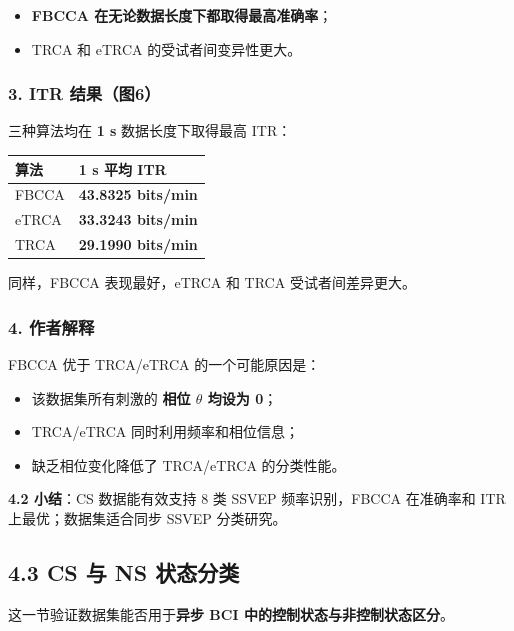 \documentclass[12pt, a4paper]{ctexart}
\begin{document}
\begin{itemize}
  \item \textbf{FBCCA 在无论数据长度下都取得最高准确率}；
  \item TRCA 和 eTRCA 的受试者间变异性更大。
\end{itemize}

\subsubsection*{3. ITR 结果（图6）}

三种算法均在 \textbf{1 s} 数据长度下取得最高 ITR：

\begin{table}[h]
\centering\small
\begin{tabular}{ll}
\toprule
\textbf{算法} & \textbf{1 s 平均 ITR} \\
\midrule
FBCCA & \textbf{43.8325 bits/min} \\
eTRCA & \textbf{33.3243 bits/min} \\
TRCA & \textbf{29.1990 bits/min} \\
\bottomrule
\end{tabular}
\end{table}

同样，FBCCA 表现最好，eTRCA 和 TRCA 受试者间差异更大。

\subsubsection*{4. 作者解释}

FBCCA 优于 TRCA/eTRCA 的一个可能原因是：

\begin{itemize}
  \item 该数据集所有刺激的 \textbf{相位 $\theta$ 均设为 0}；
  \item TRCA/eTRCA 同时利用频率和相位信息；
  \item 缺乏相位变化降低了 TRCA/eTRCA 的分类性能。
\end{itemize}

\textbf{4.2 小结}：CS 数据能有效支持 8 类 SSVEP 频率识别，FBCCA 在准确率和 ITR 上最优；数据集适合同步 SSVEP 分类研究。

\subsection{4.3 CS 与 NS 状态分类}

这一节验证数据集能否用于\textbf{异步 BCI 中的控制状态与非控制状态区分}。
\end{document}
